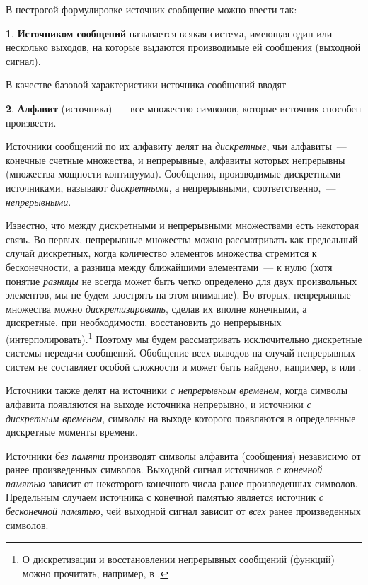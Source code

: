 \documentclass[12pt,a4paper,openright]{book}
\theoremstyle{definition}
\newtheorem{definition}{\textls[150]{Определение}}[chapter]
\numberwithin{equation}{chapter}
\begin{document}
	В нестрогой формулировке источник сообщение можно ввести так:
	\begin{definition}
		\textbf{Источником сообщений} называется всякая система, имеющая один или несколько выходов, на которые выдаются производимые ей сообщения (выходной сигнал).
	\end{definition}

	В качестве базовой характеристики источника сообщений вводят
	\begin{definition}
		\textbf{Алфавит} (источника)~--- все множество символов, которые источник способен произвести.
	\end{definition}

	Источники сообщений по их алфавиту делят на \textit{дискретные}, чьи алфавиты~--- конечные счетные множества, и непрерывные, алфавиты которых непрерывны (множества мощности континуума). Сообщения, производимые дискретными источниками, называют \textit{дискретными}, а непрерывными, соответственно,~--- \textit{непрерывными}.

	Известно, что между дискретными и непрерывными множествами есть некоторая связь. Во-первых, непрерывные множества можно рассматривать как предельный случай дискретных, когда количество элементов множества стремится к бесконечности, а разница между ближайшими элементами~--- к нулю (хотя понятие \textit{разницы} не всегда может быть четко определено для двух произвольных элементов, мы не будем заострять на этом внимание). Во-вторых, непрерывные множества можно \textit{дискретизировать}, сделав их вполне конечными, а дискретные, при необходимости, восстановить до непрерывных (интерполировать).\footnote{О дискретизации и восстановлении непрерывных сообщений (функций) можно прочитать, например, в \cite[гл.2, стр.27]{bib:panin}.} Поэтому мы будем рассматривать исключительно дискретные системы передачи сообщений. Обобщение всех выводов на случай непрерывных систем не составляет особой сложности и может быть найдено, например, в \cite{bib:panin} или \cite{bib:fano}.

	Источники также делят на источники \textit{с непрерывным временем}, когда символы алфавита появляются на выходе источника непрерывно, и источники \textit{с дискретным временем}, символы на выходе которого появляются в определенные дискретные моменты времени.

	Источники \textit{без памяти} производят символы алфавита (сообщения) независимо от  ранее произведенных символов. Выходной сигнал источников \textit{с конечной памятью} зависит от некоторого конечного числа ранее произведенных символов. Предельным случаем источника с конечной памятью является источник \textit{с бесконечной памятью}, чей выходной сигнал зависит от \textit{всех} ранее произведенных символов.
\end{document}
